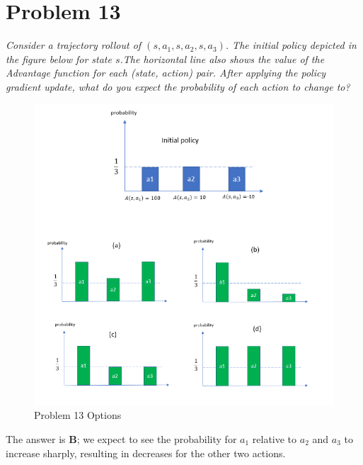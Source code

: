 \documentclass{article}
\begin{document}
\section*{Problem 13}
\textit{Consider a trajectory rollout of $(s, a_1, s, a_2, s, a_3)$. The initial policy depicted in the figure below for state $s$.The horizontal line also shows the value of the Advantage function for each (state, action) pair. After applying the policy gradient update, what do you expect the probability of each action to change  to?}

\begin{figure}
    \centering
    \includegraphics[width=.8\linewidth]{imgs/13.png}
    \caption{Problem 13 Options}
\end{figure}

The answer is \textbf{B}; we expect to see the probability for $a_1$ relative to $a_2$ and $a_3$ to increase sharply, resulting in decreases for the other two actions.
\end{document}
